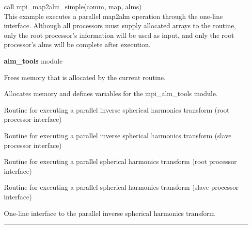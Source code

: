 \begin{example}
{
\hspace*{1cm}call mpi\_map2alm\_simple(comm, map, alms)\\
}
{
This example executes a parallel map2alm operation through the
one-line interface. Although all processors must supply allocated
arrays to the routine, only the root processor's information will be
used as input, and only the root processor's alms will be complete
after execution. 
}
\end{example}

\begin{modules}
  \begin{sulist}{} %
  \item[\textbf{alm\_tools}] module
  \end{sulist}
\end{modules}

\begin{related}
  \begin{sulist}{} %
   \item[\htmlref{mpi\_cleanup\_alm\_tools}{sub:mpi_cleanup_alm_tools}] Frees memory that is allocated by the current routine. 
   \item[\htmlref{mpi\_initialize\_alm\_tools}{sub:mpi_initialize_alm_tools}] Allocates memory and defines variables for the mpi\_alm\_tools module. 
  \item[\htmlref{mpi\_alm2map}{sub:mpi_alm2map}] Routine for executing a parallel inverse spherical harmonics transform (root processor interface)
  \item[\htmlref{mpi\_alm2map\_slave}{sub:mpi_alm2map_slave}] Routine for executing a parallel inverse spherical harmonics transform (slave processor interface)
  \item[\htmlref{mpi\_map2alm}{sub:mpi_map2alm}] Routine for executing a parallel spherical harmonics transform (root processor interface)
  \item[\htmlref{mpi\_map2alm\_slave}{sub:mpi_map2alm_slave}] Routine for executing a parallel spherical harmonics transform (slave processor interface)
  \item[\htmlref{mpi\_alm2map\_simple}{sub:mpi_alm2map_simple}] One-line interface to the parallel inverse spherical harmonics transform 
  \end{sulist}
\end{related}


\rule{\hsize}{2mm}

\newpage
